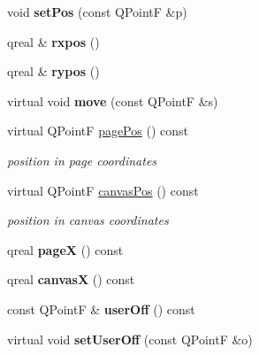 \begin{DoxyCompactItemize}
void {\bfseries set\+Pos} (const Q\+PointF \&p)
\item 
\mbox{\label{class_ms_1_1_element_a6a063f005375c9b61c53cf49ebc14623}} 
qreal \& {\bfseries rxpos} ()
\item 
\mbox{\label{class_ms_1_1_element_a1397cfb5140978e6cd9aa294ade7d738}} 
qreal \& {\bfseries rypos} ()
\item 
\mbox{\label{class_ms_1_1_element_acee1036e1efc8c4142fdf980d37b5745}} 
virtual void {\bfseries move} (const Q\+PointF \&s)
\item 
\mbox{\label{class_ms_1_1_element_a06cc027fe14db0cf896f02931356ae24}} 
virtual Q\+PointF \hyperlink{class_ms_1_1_element_a06cc027fe14db0cf896f02931356ae24}{page\+Pos} () const
\begin{DoxyCompactList}\small\item\em position in page coordinates \end{DoxyCompactList}\item 
\mbox{\label{class_ms_1_1_element_aafc617f0cd5069a406a83da394b15e53}} 
virtual Q\+PointF \hyperlink{class_ms_1_1_element_aafc617f0cd5069a406a83da394b15e53}{canvas\+Pos} () const
\begin{DoxyCompactList}\small\item\em position in canvas coordinates \end{DoxyCompactList}\item 
\mbox{\label{class_ms_1_1_element_afbc508a91ce6aa696f2f6e33bd350bd8}} 
qreal {\bfseries pageX} () const
\item 
\mbox{\label{class_ms_1_1_element_a60903fed3fd306167c53d86ff3120b3c}} 
qreal {\bfseries canvasX} () const
\item 
\mbox{\label{class_ms_1_1_element_a42f3df272426b165548fb49f5d0a850a}} 
const Q\+PointF \& {\bfseries user\+Off} () const
\item 
\mbox{\label{class_ms_1_1_element_abdb004ae5050742bb6e94eefc8067442}} 
virtual void {\bfseries set\+User\+Off} (const Q\+PointF \&o)

\end{DoxyCompactItemize}
